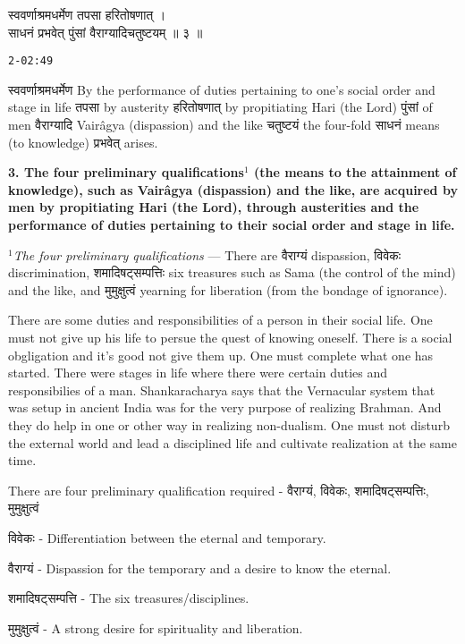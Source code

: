 \documentclass{article}
\begin{document}
\begin{large}
\begin{center}
    \begin{hindi}
	स्ववर्णाश्रमधर्मेण तपसा हरितोषणात् ।\\
	साधनं प्रभवेत् पुंसां वैराग्यादिचतुष्टयम् ॥ ३ ॥
    \end{hindi}
\end{center}
\end{large}
\texttt{2-02:49}

\texthindi{स्ववर्णाश्रमधर्मेण}
By the performance of duties pertaining to one's social order and stage in
life
\texthindi{तपसा}
by austerity
\texthindi{हरितोषणात्}
by propitiating Hari (the Lord)
\texthindi{पुंसां}
of men
\texthindi{वैराग्यादि}
Vairâgya (dispassion) and the like
\texthindi{चतुष्टयं}
the four-fold
\texthindi{साधनं}
means (to knowledge)
\texthindi{प्रभवेत्}
arises.

\bigskip

\textbf{ 3. The four preliminary qualifications$^1$ (the means to the
attainment of knowledge), such as Vairâgya (dispassion) and the like, are
acquired by men by propitiating Hari (the Lord), through austerities and the
performance of duties pertaining to their social order and stage in life.  }

{\small
\textit{$^1$The four preliminary qualifications} --- There are
\texthindi{वैराग्यं}
dispassion,
\texthindi{विवेकः}
discrimination,
\texthindi{शमादिषट्सम्पत्तिः}
six treasures such as Sama (the control of the mind) and the like, and
\texthindi{मुमुक्षुत्वं}
yearning for liberation (from the bondage of ignorance).
}

\begin{oframed}

There are some duties and responsibilities of a person in their social life.
One must not give up his life to persue the quest of knowing oneself. There is
a social obgligation and it's good not give them up. One must complete what one
has started. There were stages in life where there were certain duties and
responsibilies of a man. Shankaracharya says that the Vernacular system that
was setup in ancient India was for the very purpose of realizing Brahman. And
they do help in one or other way in realizing non-dualism. One must not disturb
the external world and lead a disciplined life and cultivate realization at the
same time.

There are four preliminary qualification required -
\texthindi{वैराग्यं, विवेकः, शमादिषट्सम्पत्तिः, मुमुक्षुत्वं}

\texthindi{विवेकः}
- Differentiation between the eternal and temporary.

\texthindi{वैराग्यं}
- Dispassion for the temporary and a desire to know the eternal.

\texthindi{शमादिषट्सम्पत्ति}
- The six treasures/disciplines.

\texthindi{मुमुक्षुत्वं}
- A strong desire for spirituality and liberation.

\end{oframed}
\end{document}
